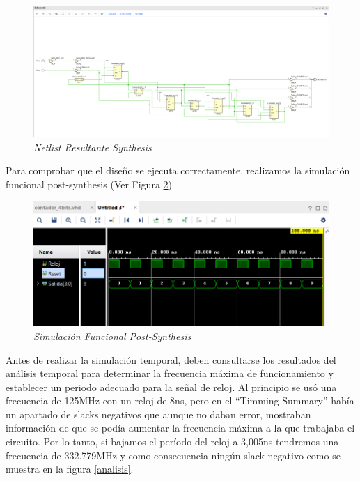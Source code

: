 \begin{figure}[H]
    \centering
    \includegraphics[width = 1\textwidth]{imagenes/netlist1.png}
    \caption{\textit{Netlist Resultante Synthesis}}\label{netlist}
\end{figure}

Para comprobar que el diseño se ejecuta correctamente, realizamos la simulación funcional post-synthesis (Ver Figura \ref{sfps})

\begin{figure}[H]
    \centering
    \includegraphics[width = 1\textwidth]{imagenes/simulacionfuncional.png}
    \caption{\textit{Simulación Funcional Post-Synthesis}}\label{sfps}
\end{figure}

Antes de realizar la simulación temporal, deben consultarse los resultados del análisis temporal para determinar la frecuencia máxima de funcionamiento 
y establecer un periodo adecuado para la señal de reloj. Al principio se usó una frecuencia de 125MHz con un reloj de 8ns, pero en el ``Timming Summary'' 
había un apartado de slacks negativos que aunque no daban error, mostraban información de que se podía aumentar la frecuencia máxima a la que trabajaba el 
circuito. Por lo tanto, si bajamos el período del reloj a 3,005ns tendremos una frecuencia de 332.779MHz y como consecuencia ningún slack negativo como se 
muestra en la figura \ref{analisis}.

